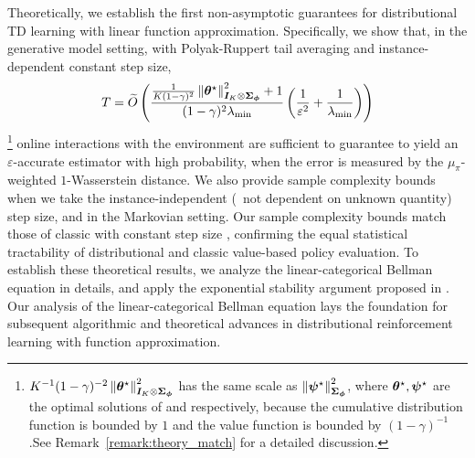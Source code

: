 Theoretically, we establish the first non-asymptotic guarantees for distributional TD learning with linear function approximation.
Specifically, we show that, in the generative model setting, with Polyak-Ruppert tail averaging and
instance-dependent constant step size, 
\begin{equation*}
   T=\widetilde{O}\left({\frac{\frac{1}{K(1-\gamma)^2}\left\|{{\bm{\theta}}^{\star}}\right\|^2_{{\bm{I}}_K\otimes{\bm{\Sigma}}_{{\bm{\phi}}}}+1}{(1-\gamma)^2\lambda_{\min}}\left({\frac{1}{\varepsilon^2}+\frac{1}{\lambda_{\min}}}\right)}\right)
\end{equation*}
\footnote{${K^{-1}(1-\gamma)^{-2}}\left\|{{\bm{\theta}}^{\star}}\right\|^2_{{\bm{I}}_K\otimes{\bm{\Sigma}}_{{\bm{\phi}}}}$ has the same scale as $\left\|{\bm{\psi}^\star}\right\|_{{\bm{\Sigma}}_{\bm{\phi}}}^2$, where ${\bm{\theta}}^{\star},\bm{\psi}^\star$ are the optimal solutions of {\LCTD} and {\LTD} respectively, because the cumulative distribution function is bounded by $1$ and the value function is bounded by $(1-\gamma)^{-1}$.See Remark~\ref{remark:theory_match} for a detailed discussion.}
online interactions with the environment are sufficient to guarantee {\LCTD} to yield an $\varepsilon$-accurate estimator with high probability, when the error is measured by the $\mu_\pi$-weighted $1$-Wasserstein distance.
We also provide sample complexity bounds when we take the 
instance-independent (\ie\ not dependent on unknown quantity) step size,
and in the Markovian setting.
Our sample complexity bounds match those of classic {\LTD} with constant step size \citep{li2024high,samsonov2024improved}, confirming the equal statistical tractability of distributional and classic value-based policy evaluation.
To establish these theoretical results, we analyze  the linear-categorical Bellman equation in details, and apply the exponential stability argument proposed in \citep{samsonov2024improved}.
Our analysis of the linear-categorical Bellman equation lays the foundation for subsequent algorithmic and theoretical advances in distributional reinforcement learning with function approximation.

